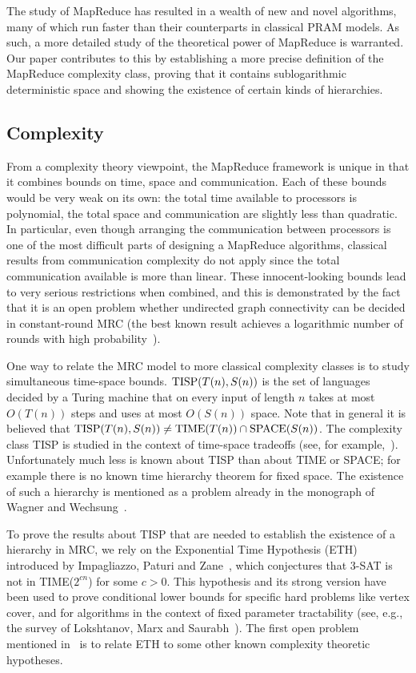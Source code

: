\documentclass[11pt]{article}
\theoremstyle{definition}
\theoremstyle{remark}
\newcommand{\SPACE}{\textup{SPACE}}
\newcommand{\TIME}{\textup{TIME}}
\newcommand{\TISP}{\textup{TISP}}
\begin{document}
The study of MapReduce has resulted in a wealth of new and novel algorithms,
many of which run faster than their counterparts in classical PRAM models. As
such, a more detailed study of the theoretical power of MapReduce is warranted.
Our paper contributes to this by establishing a more precise definition of the
MapReduce complexity class, proving that it contains sublogarithmic
deterministic space and showing the existence of certain kinds of hierarchies.

\subsection{Complexity}

From a complexity theory viewpoint, the MapReduce framework is unique in that
it combines bounds on time, space and communication. Each of these bounds would
be very weak on its own: the total time available to processors is polynomial,
the total space and communication are slightly less than quadratic.  In
particular, even though arranging the communication between processors is one
of the most difficult parts of designing a MapReduce algorithms, classical
results from communication complexity do not apply since the total
communication available is more than linear. These innocent-looking bounds lead
to very serious restrictions when combined, and this is demonstrated by the
fact that it is an open problem whether undirected graph connectivity can be
decided in constant-round MRC (the best known result achieves a logarithmic
number of rounds with high probability~\cite{Karloff10}).

One way to relate the MRC model to more classical complexity classes is to
study simultaneous time-space bounds.  $\TISP(T(n),S(n))$ is the set of
languages decided by a Turing machine that on every input of length $n$ takes
at most $O(T(n))$ steps and uses at most $O(S(n))$ space.  Note that in general
it is believed that $\TISP(T(n), S(n)) \neq \TIME(T(n)) \cap \SPACE(S(n))$.
The complexity class TISP is studied in the context of time-space tradeoffs
(see, for example,~\cite{Fortnow00, Williams08}).  Unfortunately much less is
known about TISP than about TIME or SPACE; for example there is no known time
hierarchy theorem for fixed space. The existence of such a hierarchy is
mentioned as a problem already in the monograph of Wagner and
Wechsung~\cite{WagnerW86}.

To prove the results about TISP that are needed to establish the existence of a
hierarchy in MRC, we rely on the Exponential Time Hypothesis (ETH) introduced
by Impagliazzo, Paturi and Zane~\cite{ImpagliazzoP99,ImpagliazzoPZ01},
which conjectures that 3-SAT is not in TIME($2^{cn}$) for some $c>0$. This
hypothesis and its strong version have been used to prove conditional lower
bounds for specific hard problems like vertex cover, and for algorithms in the
context of fixed parameter tractability (see, e.g., the survey of Lokshtanov,
Marx and Saurabh~\cite{LokshtanovMS11}). The first open problem mentioned
in~\cite{LokshtanovMS11} is to relate ETH to some other known complexity
theoretic hypotheses.
\end{document}
